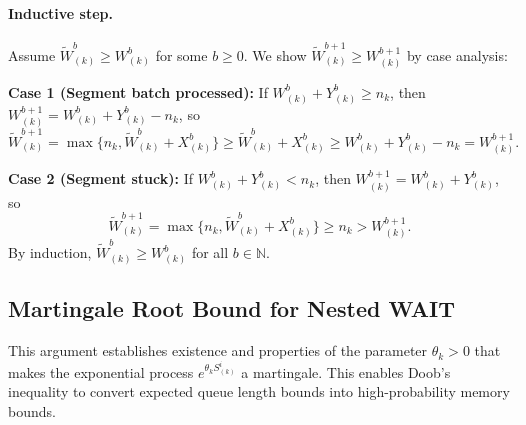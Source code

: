\paragraph{Inductive step.} Assume $\tilde{W}^b_{(k)}\geq W^b_{(k)}$ for some $b\geq 0$. We show $\tilde{W}^{b+1}_{(k)}\geq W^{b+1}_{(k)}$ by case analysis:

\textbf{Case 1 (Segment batch processed):} If $W^b_{(k)}+ Y^b_{(k)}\geq n_k$, then $W^{b+1}_{(k)}= W^{b}_{(k)}+Y^b_{(k)} - n_k$, so
$$ \tilde{W}^{b+1}_{(k)}=  \max\{ n_{k},\tilde{W}^{b}_{(k)} + X^b_{(k)}\} \geq \tilde{W}^{b}_{(k)} + X^b_{(k)}\geq {W}^{b}_{(k)} + Y^b_{(k)}-n_k=W^{b+1}_{(k)}.$$

\textbf{Case 2 (Segment stuck):} If $W^b_{(k)}+ Y^b_{(k)}<n_k$, then $W^{b+1}_{(k)}= W^{b}_{(k)}+Y^b_{(k)}$, so
$$\tilde{W}^{b+1}_{(k)}=  \max\{ n_{k},\tilde{W}^{b}_{(k)} + X^b_{(k)}\} \geq n_{k}> W^{b+1}_{(k)}.$$
By induction, $\tilde{W}^b_{(k)}\geq W^b_{(k)}$ for all $b\in \mathbb{N}$.

\subsection{Martingale Root Bound for Nested WAIT}\label{appendix_lemma::proof of solution to martingale exists}
This argument establishes existence and properties of the parameter $\theta_k>0$ that makes the exponential process $e^{\theta_k S^i_{(k)}}$ a martingale. This enables Doob's inequality to convert expected queue length bounds into high-probability memory bounds.

